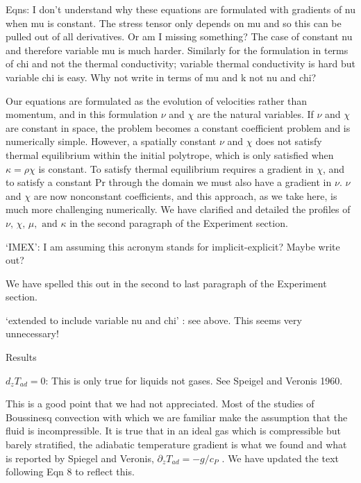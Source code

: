 \documentclass[aps, 11pt, singlecolumn]{revtex4-1} %
\begin{document}
\begin{singlespace}
\begin{myquotation}
Eqns: I don't understand why these equations are formulated with
gradients of nu when mu is constant. The stress tensor only depends on
mu and so this can be pulled out of all derivatives. Or am I missing
something? The case of constant nu and therefore variable mu is much
harder. Similarly for the formulation in terms of chi and not the
thermal conductivity; variable thermal conductivity is hard but
variable chi is easy. Why not write in terms of mu and k not nu and
chi?
\end{myquotation}
Our equations are formulated as the evolution of velocities rather
than momentum, and in this formulation $\nu$ and $\chi$ are the
natural variables.  If $\nu$ and $\chi$ are constant in space,
the problem becomes a constant coefficient problem and is numerically
simple.  However, a spatially constant $\nu$ and $\chi$ does not satisfy
thermal equilibrium within the initial polytrope, which is only satisfied when
$\kappa = \rho\chi$ is constant.  To satisfy thermal equilibrium requires
a gradient in $\chi$, and to satisfy a constant Pr through the domain we
must also have a gradient in $\nu$.  $\nu$ and $\chi$ are now nonconstant
coefficients, and this approach, as we take here, is much more challenging numerically. 
 We have
clarified and detailed the profiles of $\nu, \,\chi, \,\mu,\text{ and }\kappa$
in the second paragraph of the Experiment section.

\begin{myquotation}
`IMEX': I am assuming this acronym stands for implicit-explicit?
Maybe write out?
\end{myquotation}
We have spelled this out in the second to last paragraph of the Experiment section.

\begin{myquotation}
`extended to include variable nu and chi' : see above. This seems
very unnecessary!

Results

$d_z T_{ad} = 0$: This is only true for liquids not gases. See Speigel and
Veronis 1960.
\end{myquotation}
This is a good point that we had not appreciated.  Most of the studies of Boussinesq
convection with which we are familiar make the assumption that the fluid is incompressible.
It is true that in an ideal gas which is compressible but barely stratified, the
adiabatic temperature gradient is what we found and what is reported by
Spiegel and Veronis, $\partial_z T_{ad} = -g/c_P$ \cite{spiegel&veronis1960}.
We have updated the text following Eqn 8 to reflect this.


\end{singlespace}
\end{document}
